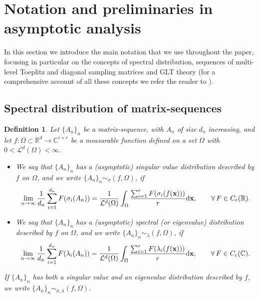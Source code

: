 \documentclass{amsart}
\newtheorem{defn}[thm]{Definition}
\begin{document}
\section{Notation and preliminaries in asymptotic analysis}\label{sec-prel}

In this section we introduce the main notation that we use throughout the paper, focusing in particular on the concepts of spectral distribution, sequences of multi-level Toeplitz and diagonal sampling matrices and GLT theory (for a comprehensive account of all these concepts we refer the reader to \cite{glt-book-1,glt-book-2}).

\subsection{Spectral distribution of matrix-sequences}

\begin{defn}\label{def-distribution}
Let $\{A_n\}_n$ be a matrix-sequence, with $A_n$ of size $d_n$ increasing, and let $f:\Omega\subset\mathbb R^d\to\mathbb{C}^{r\times r}$ be
a measurable function defined on a set $\Omega$ with $0<\mathcal{L}^d(\Omega)<\infty$.
\begin{itemize}
    \item We say that $\{A_n\}_n$ has a (asymptotic) singular value distribution described by $f$ on $\Omega$, and we write $\{A_n\}_n\sim_\sigma (f,\Omega)$, if
    \begin{equation}\label{distribution:sv-sv}
     \lim_{n\to\infty}\frac1{d_n}\sum_{i=1}^{d_n}F(\sigma_i(A_n))=\frac{1}{\mathcal{L}^d(\Omega)}\int_{\Omega}\frac{\sum_{i=1}^{r}F(\sigma_i(f(\mathbf x)))}{r}{\rm d}\mathbf x,\qquad\forall\,F\in C_c(\mathbb R).
    \end{equation}
    \item We say that $\{A_n\}_n$ has a (asymptotic) spectral (or eigenvalue) distribution described by $f$ on $\Omega$, and we write $\{A_n\}_n\sim_\lambda (f,\Omega)$, if
    \begin{equation}\label{distribution:sv-eig}
     \lim_{n\to\infty}\frac1{d_n}\sum_{i=1}^{d_n}F(\lambda_i(A_n))=\frac{1}{\mathcal{L}^d(\Omega)}\int_{\Omega}\frac{\sum_{i=1}^{r}F(\lambda_i(f(\mathbf x)))}{r}{\rm d}\mathbf x,\qquad\forall\,F\in C_c(\mathbb C).
    \end{equation}
\end{itemize}
If $\{A_n\}_n$ has both a singular value and an eigenvalue distribution described by $f$, we write $\{A_n\}_n\sim_{\sigma,\lambda}\left(f, \Omega\right)$.
\end{defn}
\end{document}
